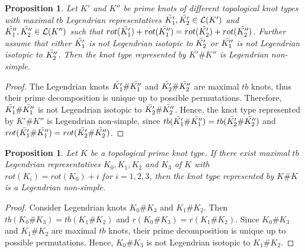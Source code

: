 \documentclass[11pt]{amsart}
\numberwithin{equation}{section}
\theoremstyle{plain}
\newtheorem{proposition}[equation]{Proposition}
\theoremstyle{definition}
\theoremstyle{remark} \newtheorem{remark}[equation]{Remark}
\theoremstyle{remark} \newtheorem{observation}[equation]{Observation}
\begin{document}
\begin{proposition}\label{CostL16}
Let $K'$ and $K''$ be prime knots of different topological knot types with maximal $tb$ Legendrian representatives $\Bar{K_1'},\Bar{K_2'}\in \mathcal{L}(K')$  and $\Bar{K_1''},\Bar{K_2''}\in \mathcal{L}(K'')$ such that $rot(\Bar{K_1'})+rot(\Bar{K_1''})=rot(\Bar{K_2'})+rot(\Bar{K_2''})$. Further assume that either $ \Bar{K_1'} $ is not Legendrian isotopic to $\Bar{K_2'}$ or $ \Bar{K_1''} $ is not Legendrian isotopic to $\Bar{K_2''}$. Then the knot type represented by $K'\#K''$ is Legendrian non-simple.
\end{proposition}
   
\begin{proof}
   
The Legendrian knots $\Bar{K_1'}\#\Bar{K_1''}$ and $\Bar{K_2'}\#\Bar{K_2''}$ are maximal $tb$ knots, thus their prime decomposition is unique up to possible permutations. Therefore, $\Bar{K_1'}\#\Bar{K_1''}$ is not Legendrian isotopic to $\Bar{K_2'}\#\Bar{K_2''}$. Hence, the knot type represented by $K'\#K''$ is Legendrian non-simple, since $tb(\Bar{K_1'}\#\Bar{K_1''})=tb(\Bar{K_2'}\#\Bar{K_2''})$ and $rot(\Bar{K_1'}\#\Bar{K_1''})=rot(\Bar{K_2'}\#\Bar{K_2''})$.
\end{proof}

\begin{proposition}\label{CostL17}
    Let $K$ be a topological prime knot type. If there exist maximal $tb$ Legendrian representatives $K_0,K_1,K_2$ and $K_3$ of $K$ with $rot(K_i)=rot(K_0)+i$ for $i=1,2,3$, then the knot type represented by $K\#K$ is a Legendrian non-simple.
\end{proposition}

\begin{proof}
    Consider Legendrian knots $K_0\#K_3$ and $K_1\#K_2$. Then $tb(K_0\#K_3)=tb(K_1\#K_2)$
 and $r(K_0\#K_3)=r(K_1\#K_2)$. Since $K_0\#K_3$ and $K_1\#K_2$ are maximal $tb$ knots, their prime decomposition is unique up to possible permutations. Hence, $K_0\#K_3$ is not Legendrian isotopic to $K_1\#K_2$.
 \end{proof}
\end{document}
